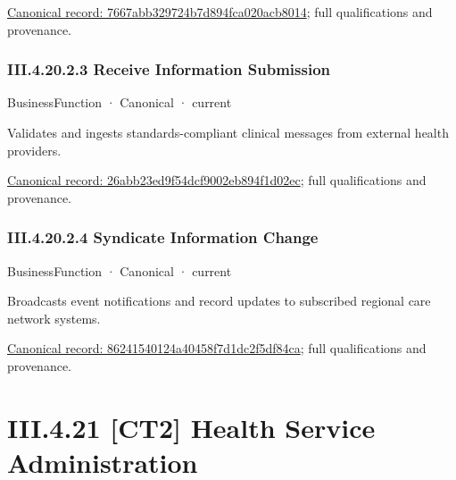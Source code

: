 {\footnotesize \href{../../../../continuum/business/business-function/7667abb329724b7d894fca020acb8014.md}{Canonical record: 7667abb329724b7d894fca020acb8014}; full qualifications and provenance.}\par
\subsubsection*{III.4.20.2.3 Receive Information Submission}
\label{navigation:III.4.20.2.3}

\label{element:26abb23ed9f54dcf9002eb894f1d02ec}
{\small BusinessFunction · Canonical · current}\par

Validates and ingests standards-compliant clinical messages from external health providers.


{\footnotesize \href{../../../../continuum/business/business-function/26abb23ed9f54dcf9002eb894f1d02ec.md}{Canonical record: 26abb23ed9f54dcf9002eb894f1d02ec}; full qualifications and provenance.}\par
\subsubsection*{III.4.20.2.4 Syndicate Information Change}
\label{navigation:III.4.20.2.4}

\label{element:86241540124a40458f7d1dc2f5df84ca}
{\small BusinessFunction · Canonical · current}\par

Broadcasts event notifications and record updates to subscribed regional care network systems.


{\footnotesize \href{../../../../continuum/business/business-function/86241540124a40458f7d1dc2f5df84ca.md}{Canonical record: 86241540124a40458f7d1dc2f5df84ca}; full qualifications and provenance.}\par
\section*{III.4.21 [CT2] Health Service Administration}
\label{navigation:III.4.21}

